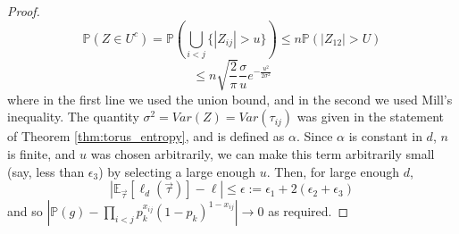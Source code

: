 \documentclass{article}
\newcommand{\prob}[1]{\mathbb{P}\left(#1\right)}
\begin{document}
\begin{proof}
\begin{equation}
     \prob{Z \in U^c} = \prob{\bigcup_{i<j} \{|Z_{ij}| > u\}} \leq n\prob{|Z_{12}| > U}
    \end{equation}
    \begin{equation}
        \leq n\sqrt{\frac{2}{\pi}}\frac{\sigma}{u}e^{-\frac{u^2}{2\sigma^2}}
    \end{equation}
    where in the first line we used the union bound, and in the second we used Mill's inequality. The quantity $\sigma^2 = Var(Z) = Var(\tau_{ij})$ was given in the statement of Theorem \ref{thm:torus_entropy}, and is defined as $\alpha$. Since $\alpha$ is constant in $d$, $n$ is finite, and $u$ was chosen arbitrarily, we can make this term arbitrarily small (say, less than $\epsilon_3$) by selecting a large enough $u$. Then, for large enough $d$,
    \begin{equation}
        |\mathbb{E}_{\vec{\tau}}[\ell_d(\vec{\tau})] - \ell| \leq \epsilon := \epsilon_1 + 2(\epsilon_2+\epsilon_3)
    \end{equation}
    and so $\left|\mathbb{P}(g) - \prod_{i<j} p_k^{x_{ij}}(1-p_k)^{1-x_{ij}}\right| \rightarrow 0$ as required. 
\end{proof}
\end{document}
